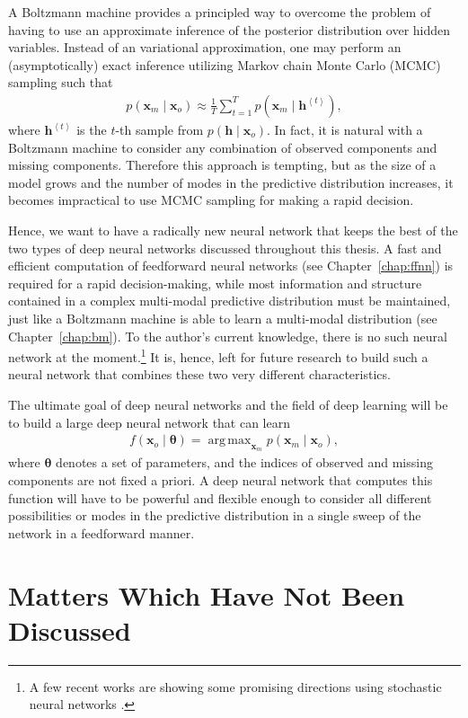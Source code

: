 \documentclass[dissertation,nocontribution]{aaltoseries}
\newcommand{\qt}[1]{\left<#1\right>}
\newcommand{\vect}[1]{\mathbf{#1}}
\newcommand{\vects}[1]{\boldsymbol{#1}}
\newcommand{\vh}[0]{\vect{h}}
\newcommand{\vx}[0]{\vect{x}}
\newcommand{\TT}[0]{{\vects{\theta}}}
\DeclareMathOperator*{\argmax}{arg\,max}
\begin{document}
A Boltzmann machine provides a principled way to overcome
the problem of having to use an approximate inference of the
posterior distribution over hidden variables. Instead of an
variational approximation, one may perform an
(asymptotically) exact inference utilizing Markov chain
Monte Carlo (MCMC) sampling such that
\begin{align*}
    p(\vx_m \mid \vx_o) \approx \frac{1}{T} \sum_{t=1}^T
    p(\vx_m \mid \vh^{\qt{t}}),
\end{align*}
where $\vh^{\qt{t}}$ is the $t$-th sample from $p(\vh \mid
\vx_o)$. In fact, it is natural with a Boltzmann machine to
consider any combination of observed components and missing
components. Therefore this approach is tempting, but as the
size of a model grows and the number of modes in the
predictive distribution increases, it becomes impractical to
use MCMC sampling for making a rapid decision.

Hence, we want to have a radically new neural network that
keeps the best of the two types of deep neural networks
discussed throughout this thesis. A fast and efficient
computation of feedforward neural networks (see
Chapter~\ref{chap:ffnn}) is required for a rapid
decision-making, while most information and structure
contained in a complex multi-modal predictive distribution
must be maintained, just like a Boltzmann machine is able to
learn a multi-modal distribution (see
Chapter~\ref{chap:bm}). To the author's current knowledge,
there is no such neural network at the moment.\footnote{
A few recent works are showing some promising directions using
stochastic neural networks \citet[see,
e.g.,][]{Bengio2013gsn,Tang2013}.} It is, hence, left for
future research to build such a neural network that combines these
two very different characteristics.

The ultimate goal of deep neural networks and the field of
deep learning will be to build a large deep neural network
that can learn
\begin{align*}
    f(\vx_o\mid \TT) = \argmax_{\vx_m} p(\vx_m \mid \vx_o),
\end{align*}
where $\TT$ denotes a set of parameters, and the indices of
observed and missing components are not fixed a priori. A
deep neural network that computes this function will have to
be powerful and flexible enough to consider all different
possibilities or modes in the predictive distribution in a
single sweep of the network in a feedforward manner.



\section{Matters Which Have Not Been Discussed}
\label{sec:leftovers}
\end{document}
